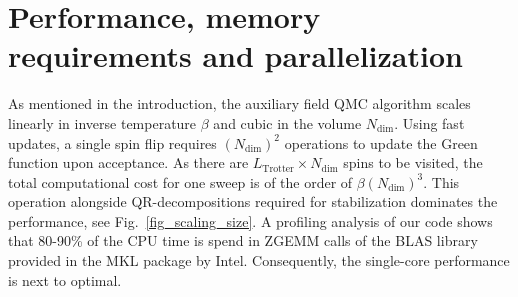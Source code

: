 \section{Performance, memory requirements and parallelization} \label{sec:performance}
%

As mentioned in the  introduction, the auxiliary field QMC algorithm scales linearly in inverse temperature $\beta$ and cubic in the volume $N_{\text{dim}}$. Using fast updates,  a single spin flip  requires $(N_{\text{dim}})^2$ operations to update the Green function upon acceptance.  As there are $L_{\text{Trotter}}\times N_{\text{dim}}$ spins to be visited, the total computational cost for one sweep is of the order of $\beta (N_{\text{dim}})^3$. This operation  alongside QR-decompositions required for stabilization  dominates the performance,  see Fig.~\ref{fig_scaling_size}. A profiling analysis of our code shows that 80-90\% of the CPU time is spend in ZGEMM calls of the BLAS library provided in the MKL package by Intel. Consequently, the single-core performance is next to optimal.

